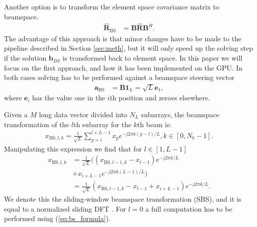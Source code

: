 \documentclass[journal]{IEEEtran}
\newcommand{\mat}[1]{\mathbf{#1}}
\renewcommand{\vec}[1]{\mathbf{#1}}
\begin{document}
Another option is to transform the element space covariance matrix to beamspace. 
\begin{align}
\mat{\hat{R}}_\text{BS} &= \mat{B}\mat{\hat{R}}\mat{B}^H.
\end{align}
The advantage of this approach is that minor changes have to be made to the pipeline described in Section \ref{sec:meth}, but it will only speed up the solving step if the solution $\vec{b}_{BS}$ is transformed back to element space. In this paper we will focus on the first approach, and how it has been implemented on the GPU.
In both cases solving has to be performed against a beamspace steering vector
\begin{align}
\vec{a}_\text{BS} &= \mat{B}\vec{1}_L = \sqrt{L}\vec{e}_1,
\end{align}
where $\vec{e}_i$ has the value one in the $i$th position and zeroes elsewhere.

Given a $M$ long data vector divided into $N_L$ subarrays, the beamspace transformation of the $l$th subarray for the $k$th beam is:
\begin{align}\label{eq:bs_formula}
x_{\text{BS},l,k} = \frac{1}{\sqrt{L}}\sum_{p=i}^{l+L-1}x_p e^{-j2\pi k(p-l)/L} , k \in [0, N_b-1].
\end{align}
Manipulating this expression we find that for $l \in [1, L-1]$
\begin{align}\label{eq:sliding_bs}
x_{\text{BS},l,k} &= \frac{1}{\sqrt{L}}((x_{\text{BS},l-1,k} - x_{l-1})e^{-j2\pi k/L} \nonumber \\ &+ x_{i+L-1}e^{-j2\pi k(L-1)/L}) \nonumber \\
&= \frac{1}{\sqrt{L}}(x_{\text{BS},l-1,k} - x_{l-1} + x_{i+L-1})e^{-j2\pi k/L}.
\end{align}
We denote this the sliding-window beamspace transformation (SBS), and it is equal to a normalized sliding DFT \cite{Lyons2003}. For $l=0$ a full computation has to be performed using (\ref{eq:bs_formula}).
\end{document}
